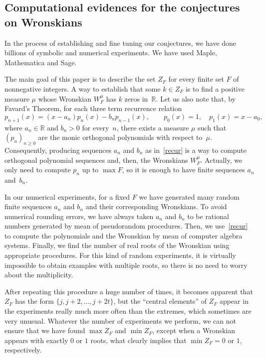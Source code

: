 \documentclass[10pt]{article}
\theoremstyle{plain}
\theoremstyle{definition}
\numberwithin{equation}{section} %
\newcommand\RR{\mathbb{R}}
\begin{document}
\subsection{Computational evidences for the conjectures on Wronskians}

In the process of establishing and fine tuning our conjectures, we have done billions of symbolic and numerical experiments. We have used Maple, Mathematica and Sage.

The main goal of this paper is to describe the set $Z_F$ for every finite set $F$ of nonnegative integers.
A way to establish that some $k \in Z_F$ is to find a positive measure $\mu$ whose Wronskian $W_{F}^{\mu}$ has $k$ zeros in~$\RR$.
Let us also note that, by Favard's Theorem, for each three term recurrence relation
\begin{equation}
\label{recur}
  p_{n+1}(x) = (x-a_n) p_{n}(x) - b_n p_{n-1}(x),
  \qquad p_0(x) = 1,\quad p_1(x) = x-a_0,
\end{equation}
where $a_n \in \RR$ and $b_n > 0$ for every~$n$,
there exists a measure $\mu$ such that $(p_n)_{n\ge0}$ are the monic orthogonal polynomials with respect to~$\mu$.
Consequently, producing sequences $a_n$ and $b_n$ as in~\eqref{recur} is a way to compute orthogonal polynomial sequences and, then, the Wronskians $W_{F}^{\mu}$.
Actually, we only need to compute $p_{n}$ up to $\max F$, so it is enough to have finite sequences $a_n$ and~$b_n$.

In our numerical experiments, for a fixed $F$ we have generated many random finite sequences $a_n$ and $b_n$ and their corresponding Wronskians.
To avoid numerical rounding errors, we have always taken $a_n$ and $b_n$ to be rational numbers generated by mean of pseudorandom procedures.
Then, we use~\eqref{recur} to compute the polynomials and the Wronskian by mean of computer algebra systems.
Finally, we find the number of real roots of the Wronskian using appropriate procedures. For this kind of random experiments, it is virtually impossible to obtain examples with multiple roots, so there is no need to worry about the multiplicity.

After repeating this procedure a huge number of times, it becomes apparent that $Z_F$ has the form $\{j, j+2,\dots,j+2t\}$, but the ``central elements'' of $Z_F$ appear in the experiments really much more often than the extremes, which sometimes are very unusual.
Whatever the number of experiments we perform, we can not ensure that we have found $\max Z_F$ and $\min Z_F$, except when a Wronskian appears with exactly $0$ or $1$ roots, what clearly implies that $\min Z_F = 0$ or $1$, respectively.
\end{document}
